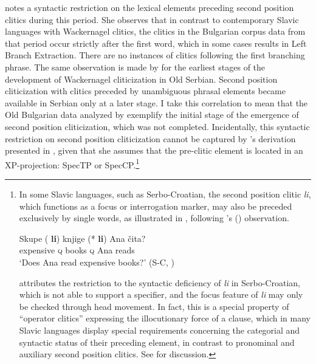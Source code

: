 \documentclass[output=paper,
modfonts,
newtxmath,
hidelinks
]{langscibook}
\begin{document}
\citeauthor{pancheva2005} notes a syntactic restriction on the lexical elements preceding second position clitics during this period. She observes that in contrast to contemporary Slavic languages with Wackernagel clitics, the clitics in the Bulgarian corpus data from that period occur strictly after the first word, which in some cases results in Left Branch Extraction. There are no instances of clitics following the first branching phrase. The same observation is made by \citet[Chapter 3]{radanovickocic1988} for the earliest stages of the development of Wackernagel cliticization in Old Serbian. Second position cliticization with clitics preceded by unambiguous phrasal elements became available in Serbian only at a later stage. I take this correlation to mean that the Old Bulgarian data analyzed by \citet{pancheva2005} exemplify the initial stage of the emergence of second position cliticization, which was not completed. Incidentally, this syntactic restriction on second position cliticization cannot be captured by \citeauthor{pancheva2005}’s derivation presented in , given that she assumes that the pre-clitic element is located in an XP-projection: SpecTP or SpecCP.\footnote{\label{11:fn1}In some Slavic languages, such as Serbo-Croatian, the second position clitic \textit{li}, which functions as a focus or interrogation marker, may also be preceded exclusively by single words, as illustrated in , following \citeauthor{Boskovic2001}'s (\citeyear[27]{Boskovic2001}) observation.

\ea \label{11:exfni}
\gll Skupe (\hspace{-2pt} \textbf{li}) knjige (*\hspace{-2pt} \textbf{li}) Ana čita?\\
expensive {} \textsc{q} books {} \textsc{q} Ana reads\\
\glt `Does Ana read expensive books?' \hfill(S-C, \citealt[27]{Boskovic2001})
\z

\noindent \citet[31ff.]{Boskovic2001} attributes the restriction to the syntactic deficiency of \textit{li} in Serbo-Croatian, which is not able to support a specifier, and the focus feature of \textit{li} may only be checked through head movement. In fact, this is a special property of “operator clitics” expressing the illocutionary force of a clause, which in many Slavic languages display special requirements concerning the categorial and syntactic status of their preceding element, in contrast to pronominal and auxiliary second position clitics. See \citet[Chapter 3]{migdalski2016} for discussion.}
\end{document}

